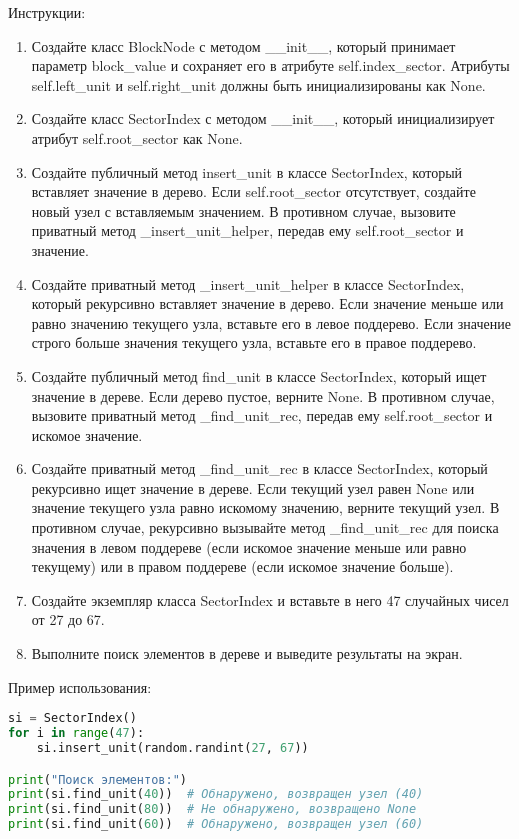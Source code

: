 \begin{enumerate}
Инструкции:
\begin{enumerate}
    \item Создайте класс BlockNode с методом \_\_init\_\_, который принимает параметр block\_value и сохраняет его в атрибуте self.index\_sector. Атрибуты self.left\_unit и self.right\_unit должны быть инициализированы как None.
    \item Создайте класс SectorIndex с методом \_\_init\_\_, который инициализирует атрибут self.root\_sector как None.
    \item Создайте публичный метод insert\_unit в классе SectorIndex, который вставляет значение в дерево. Если self.root\_sector отсутствует, создайте новый узел с вставляемым значением. В противном случае, вызовите приватный метод \_insert\_unit\_helper, передав ему self.root\_sector и значение.
    \item Создайте приватный метод \_insert\_unit\_helper в классе SectorIndex, который рекурсивно вставляет значение в дерево. Если значение меньше или равно значению текущего узла, вставьте его в левое поддерево. Если значение строго больше значения текущего узла, вставьте его в правое поддерево.
    \item Создайте публичный метод find\_unit в классе SectorIndex, который ищет значение в дереве. Если дерево пустое, верните None. В противном случае, вызовите приватный метод \_find\_unit\_rec, передав ему self.root\_sector и искомое значение.
    \item Создайте приватный метод \_find\_unit\_rec в классе SectorIndex, который рекурсивно ищет значение в дереве. Если текущий узел равен None или значение текущего узла равно искомому значению, верните текущий узел. В противном случае, рекурсивно вызывайте метод \_find\_unit\_rec для поиска значения в левом поддереве (если искомое значение меньше или равно текущему) или в правом поддереве (если искомое значение больше).
    \item Создайте экземпляр класса SectorIndex и вставьте в него 47 случайных чисел от 27 до 67.
    \item Выполните поиск элементов в дереве и выведите результаты на экран.
\end{enumerate}

Пример использования:
\begin{lstlisting}[language=Python]
si = SectorIndex()
for i in range(47):
    si.insert_unit(random.randint(27, 67))

print("Поиск элементов:")
print(si.find_unit(40))  # Обнаружено, возвращен узел (40)
print(si.find_unit(80))  # Не обнаружено, возвращено None
print(si.find_unit(60))  # Обнаружено, возвращен узел (60)
\end{lstlisting}


\end{enumerate}

